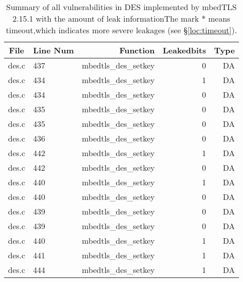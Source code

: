 \begin{table*}%
\centering
\caption{Summary of all vulnerabilities in DES implemented by mbedTLS 2.15.1 with the amount of leak informationThe mark $*$ means timeout,which indicates more severe leakages (see \S\ref{loc:timeout}).}\label{tab:DESmbedTLS}
\begin{tabular}{clrrr}
\hline
\textbf{File} & \textbf{Line Num} & \textbf{Function} & \textbf{Leakedbits} & \textbf{Type} \\\hline
des.c&437&mbedtls\_des\_setkey&0 &DA\\
des.c&434&mbedtls\_des\_setkey&1 &DA\\
des.c&434&mbedtls\_des\_setkey&0 &DA\\
des.c&435&mbedtls\_des\_setkey&0 &DA\\
des.c&435&mbedtls\_des\_setkey&0 &DA\\
des.c&436&mbedtls\_des\_setkey&0 &DA\\
des.c&442&mbedtls\_des\_setkey&1 &DA\\
des.c&442&mbedtls\_des\_setkey&0 &DA\\
des.c&440&mbedtls\_des\_setkey&1 &DA\\
des.c&440&mbedtls\_des\_setkey&0 &DA\\
des.c&439&mbedtls\_des\_setkey&0 &DA\\
des.c&439&mbedtls\_des\_setkey&0 &DA\\
des.c&440&mbedtls\_des\_setkey&1 &DA\\
des.c&441&mbedtls\_des\_setkey&1 &DA\\
des.c&444&mbedtls\_des\_setkey&1 &DA\\
\hline
\end{tabular}
\end{table*}